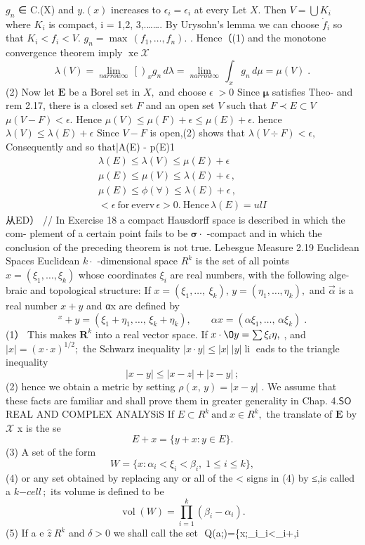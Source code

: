 ${\mathit{g_{n}}}$ ∈ C.(X) and $\scriptstyle y.(x)$ increases to $\scriptstyle\epsilon_{i}=\epsilon_{i}$ at every Let $X.$ Then $V=\bigcup K_{i}$ where $K_{i}$ is compact, i = 1,2, 3,.……. By Urysohn's lemma we can choose ${\dot{f}}_{i}$ so that $K_{i}<f_{i}<V.$ $g_{n}=\operatorname*{max}\,(f_{1},\dots,f_{n}).$ . Hence（(1) and the monotone convergence theorem imply $\operatorname{xe}{\mathcal{X}}$ $$ \lambda(V)=\operatorname*{lim}_{n arrow\infty}\,\left[\right)_{x}^{}g_{n}\,d\lambda=\operatorname*{lim}_{n arrow\infty}\,\int_{x}g_{n}\,d\mu=\mu(V)\;. $$ (2) Now let $\boldsymbol{E}$ be a Borel set in $X,$ and choose $\scriptstyle\epsilon\;>0$ Since ${\boldsymbol{\mu}}$ satisfies Theo- and rem 2.17, there is a closed set ${\mathbf{}}F$ and an open set ${\mathbf{}}V$ such that $F\prec E\subset V$ $\mu(V-F)<\epsilon.$ Hence $\mu(V)\leq\mu(F)+\epsilon\leq\mu(E)+\epsilon.$ hence $\lambda(V)\leq\lambda(E)+\epsilon$ Since $V-F$ is open,(2) shows that $\lambda(V\div F)<\epsilon,$ Consequently and so that|A(E) - p(E)1 $$ \begin{array}{c}{{\lambda(E)\leq\lambda(V)\leq\mu(E)+\epsilon}}\\ {{\mu(E)\leq\mu(V)\leq\lambda(E)+\epsilon\,,}}\\ {{\mu(E)\leq\phi(\forall)\leq\lambda(E)+\epsilon\,,}}\\ {{<\epsilon{\mathrm{~for~everv}}\,\epsilon>0.~{\mathrm{Hence}}\,\lambda(E)=u l I}}\end{array} $$ 从ED） // In Exercise 18 a compact Hausdorff space is described in which the com- plement of a certain point fails to be ${\boldsymbol{\sigma}}\cdot$ -compact and in which the conclusion of the preceding theorem is not true. Lebesgue Measure 2.19 Euclidean Spaces Euclidean $k\!\cdot\!$ -dimensional space $R^{k}$ is the set of all points $x=(\xi_{1},\dots,\xi_{k})$ whose coordinates $\xi_{i}$ are real numbers, with the following alge- braic and topological structure: If $x=(\xi_{1},\ldots,\ \xi_{k}),\,y=(\eta_{1},\ldots,\eta_{k}),$ and $\scriptstyle{\vec{\alpha}}$ is a real number $x+y$ and αx are defined by $$ {}^{x}+y=(\xi_{1}+\eta_{1},\dots,\,\xi_{k}+\eta_{k}),\qquad\alpha x=(\alpha\xi_{1},\dots,\,\alpha\xi_{k})\;. $$ (1） This makes ${\boldsymbol{R}}^{k}$ into a real vector space. If $x\cdot\O y=\sum\xi_{i}\eta,$ , and $|x|=(x\cdot x)^{1/2};$ the Schwarz inequality $|x\cdot y|\leq|x|\ |y|\operatorname{li}$ eads to the triangle inequality $$ |x-y|\leq|x-z|+|z-y|\,; $$ (2) hence we obtain a metric by setting $\rho(x,\,y)=|x-y|$ . We assume that these facts are familiar and shall prove them in greater generality in Chap. 4.${\mathsf{S O}}$ REAL AND COMPLEX ANALYSiS If $E\subset R^{k}{\mathrm{~and~}}x\in R^{k},$ the translate of $\boldsymbol{E}$ by $\scriptstyle{\mathcal{X}}$ x is the se $$ E+x=\{y+x\colon y\in E\}. $$ (3) A set of the form $$ W=\{x\colon\alpha_{i}<\xi_{i}<\beta_{i},\;1\leq i\leq k\}, $$ (4) or any set obtained by replacing any or all of the < signs in (4) by ≤,is called a $k{\mathrm{-}}c e l l\,;$ its volume is defined to be $$ \operatorname{vol}\left(W\right)=\prod_{i=1}^{k}\left(\beta_{i}-\alpha_{i}\right). $$ (5) If a e $\hat{z}\ R^{k}$ and $\scriptstyle\delta>0$ we shall call the set $$ Q(a;\delta)=\left\{x;\alpha_{i}\leq\xi_{i}<\alpha_{i}+\delta,\leq i\leq 